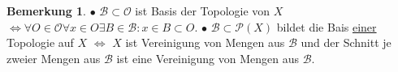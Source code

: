 \documentclass[a4paper,11pt,notitlepage]{report}
\theoremstyle{definition}
\newtheorem{remark}{Bemerkung}[chapter]
\newcommand{\OO}{{\ensuremath{\mathcal{O}}}}
\begin{document}
\begin{remark}
	$\bullet$ $\mathcal{B} \subset \OO$ ist Basis der Topologie von $X$ $\Leftrightarrow \forall O \in \OO \forall x \in O \exists B \in \mathcal{B} \colon x \in B \subset O$.
	\newline
	$\bullet$ $\mathcal{B} \subset \mathcal{P}(X)$ bildet die Bais \underline{einer} Topologie auf $X$ $\Leftrightarrow$ $X$ ist Vereinigung von Mengen aus $\mathcal{B}$ und der Schnitt je zweier Mengen aus $\mathcal{B}$ ist eine Vereinigung von Mengen aus $\mathcal{B}$.
	\newline
	\begin{figure}[h]
		\centering
		\qquad
	\end{figure}
\end{remark}
\end{document}
